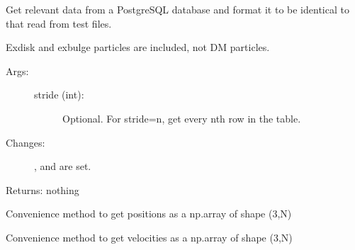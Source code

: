 \documentclass[letterpaper,10pt,english]{sphinxmanual}
\begin{document}
\begin{fulllineitems}
\begin{description}
\begin{description}
\end{description}

\end{description}

\begin{fulllineitems}
\label{\detokenize{remnant:galaxy.remnant.Remnant.read_db}}
Get relevant data from a PostgreSQL database and format it to be 
identical to that read from test files.

Ex\sphinxhyphen{}disk and ex\sphinxhyphen{}bulge particles are included, not DM particles.
\begin{description}
\item[{Args:}] \leavevmode\begin{description}
\item[{stride (int):}] \leavevmode
Optional. For stride=n, get every nth row in the table.

\end{description}

\item[{Changes:}] \leavevmode
{},  and  are set.

\end{description}

Returns: nothing

\end{fulllineitems}


\begin{fulllineitems}
\label{\detokenize{remnant:galaxy.remnant.Remnant.xyz}}
Convenience method to get positions as a np.array of shape (3,N)

\end{fulllineitems}


\begin{fulllineitems}
\label{\detokenize{remnant:galaxy.remnant.Remnant.vxyz}}
Convenience method to get velocities as a np.array of shape (3,N)


\end{fulllineitems}
\end{fulllineitems}
\end{document}
